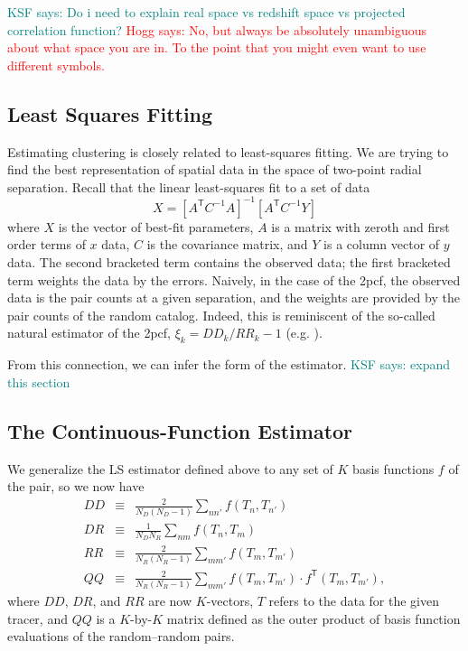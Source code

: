 \documentclass[modern]{aastex62}
\newcommand{\cf}{2pcf\xspace} %
\newcommand{\Est}{The Continuous-Function Estimator\xspace}
\newcommand{\LS}{LS\xspace}
\newcommand{\inv}{^{-1}}
\newcommand{\T}{^{\mathsf{T}}}
\newcommand{\KSF}[1]{\textcolor{teal}{KSF says: #1}}
\newcommand{\hogg}[1]{\textcolor{red}{Hogg says: #1}}
\begin{document}
\KSF{Do i need to explain real space vs redshift space vs projected correlation function?} \hogg{No, but always be absolutely unambiguous about what space you are in. To the point that you might even want to use different symbols.}

\subsection{Least Squares Fitting}

Estimating clustering is closely related to least-squares fitting.
We are trying to find the best representation of spatial data in the space of two-point radial separation.
Recall that the linear least-squares fit to a set of data 
\begin{equation}
X = [A\T C\inv A]\inv [A\T C\inv Y]
\end{equation}
where $X$ is the vector of best-fit parameters, $A$ is a matrix with zeroth and first order terms of $x$ data, $C$ is the covariance matrix, and $Y$ is a column vector of $y$ data.
The second bracketed term contains the observed data; the first bracketed term weights the data by the errors.
Naively, in the case of the \cf, the observed data is the pair counts at a given separation, and the weights are provided by the pair counts of the random catalog.
Indeed, this is reminiscent of the so-called natural estimator of the \cf, $\xi_k = DD_k/RR_k - 1$ (e.g. \citealt{Kerscher2000}).

From this connection, we can infer the form of the estimator.
\KSF{expand this section}

\subsection{\Est}
\label{sec:est}

We generalize the \LS estimator defined above to any set of $K$ basis functions $f$ of the pair, so we now have
\begin{eqnarray}\displaystyle
DD &\equiv& \frac{2}{N_D(N_D-1)} \sum_{n n'} f(T_n, T_{n'}) \\
DR &\equiv& \frac{1}{N_D N_R} \sum_{n m} f(T_n, T_{m}) \\
RR &\equiv& \frac{2}{N_R(N_R-1)} \sum_{m m'} f(T_m, T_{m'}) \\
QQ &\equiv& \frac{2}{N_R(N_R-1)} \sum_{m m'} f(T_m, T_{m'}) \cdot f\T(T_m, T_{m'}),
\end{eqnarray}
where $DD$, $DR$, and $RR$ are now $K$-vectors, $T$ refers to the data for the given tracer, and $QQ$ is a $K$-by-$K$ matrix defined as the outer product of basis function evaluations of the random--random pairs.
\end{document}
